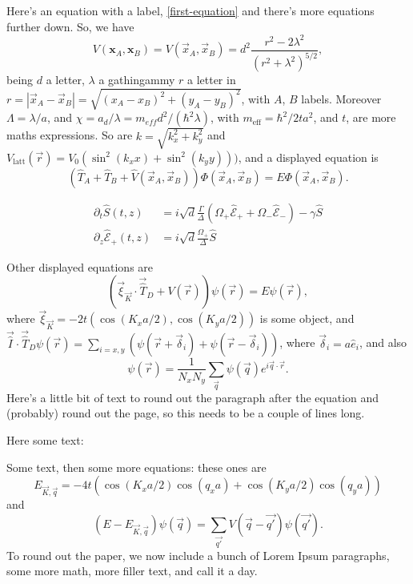 \documentclass[twoside,british,a4paper,twocolumn]{article}
\begin{document}
Here's an equation with a label, \eqref{first-equation} and there's more equations further down. So, we have
\begin{equation}
V(\mathbf{x}_A,\mathbf{x}_B)=V(\vec{x}_A,\vec{x}_B)=d^2\frac{r^2-2\lambda^2}{(r^2+\lambda^2)^{5/2}},
\label{first-equation}
\end{equation}
being $d$ a letter, $\lambda$ a gathingammy $r$ a letter in $r=|\vec{x}_A-\vec{x}_B|=\sqrt{(x_A-x_B)^2+(y_A-y_B)^2}$, with  $A$, $B$  labels. Moreover $\Lambda=\lambda/a$, and  $\chi = a_{d}/\lambda = m_{eff}d^2/(\hbar^2 \lambda)$, with $m_\mathrm{eff}=\hbar^2/2ta^2$, and $t$, are more maths expressions. So are $k=\sqrt{k_x^2+k_y^2}$ and $V_\mathrm{latt}(\vec r)= V_0\left(\sin^2(k_x x)+ \sin^2(k_y y)\right))$, and a displayed equation is 
\begin{equation}
\left(\hat{T}_A+\hat{T}_B+{\hat V}(\vec{x}_A,\vec{x}_B)\right)\Phi(\vec{x}_A,\vec{x}_B)=E\Phi(\vec{x}_A,\vec{x}_B).
\end{equation}


\lipsum[1]

\begin{align}
\partial_t \hat S(t,z) & = i\sqrt{d} \frac{\Gamma}{\Delta}\left( \Omega_+ \hat{\mathcal E}_+ + \Omega_- \hat{\mathcal E}_- \right) - \gamma \hat S \\
\partial_z \hat{\mathcal E}_+ (t,z) & = i \sqrt{d} \frac{\Omega_+}{\Delta} \hat{S}
\end{align}


\lipsum[1-3]

Other displayed equations are
\begin{equation}
(\vec{\xi}_{\vec{K}}\cdot\vec{\hat{T}}_D+V(\vec{r}))\psi(\vec{r})=E\psi(\vec{r}),
\end{equation}
where $\vec{\xi }_{\vec{K}}=-2t(\cos(K_x a/2),\cos(K_y a/2))$ is some object, and  $\vec{\hat{I}}\cdot\vec{\hat{T}}_D\psi(\vec{r})=\sum_{i=x,y}\left(\psi(\vec{r}+\vec{\delta}_i)+\psi(\vec{r}-\vec{\delta}_i)\right)$, where $\vec{\delta}_i=a\hat{e}_{i}$, and also
\begin{equation}
\psi(\vec{r})=\frac{1}{N_x N_y}\sum_{\vec{q}}\psi(\vec{q})e^{i\vec{q}\cdot\vec{r}}.
\end{equation}
Here's a little bit of text to round out the paragraph after the equation and (probably) round out the page, so this needs to be a couple of lines long.

Here some text: \lipsum[7] 

Some text, then some more equations: these ones are
$$
E_{\vec{K},\vec{q}}=-4t\left(\cos(K_xa/2)\cos(q_xa)+\cos(K_ya/2)\cos(q_ya)\right)
$$ 
and 
\begin{equation}
(E-E_{\vec{K},\vec{q}})\psi(\vec{q})=\sum_{\vec{q'}}V(\vec{q}-\vec{q'})\psi(\vec{q'}). 
\end{equation}
To round out the paper, we now include a bunch of Lorem Ipsum paragraphs, some more math, more filler text, and call it a day.
\end{document}

